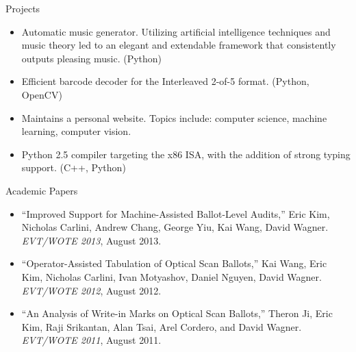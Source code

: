 \documentclass{resume}
\begin{document}
\begin{component}{Projects}
	\begin{itemize}
		\vspace{-0.5em}\item Automatic music generator. Utilizing artificial intelligence techniques and music theory led to an elegant and extendable framework that consistently outputs pleasing music.
		(Python)
        \vspace{-0.5em}\item Efficient barcode decoder
	        for the Interleaved 2-of-5 format. (Python, OpenCV)
        \vspace{-0.5em}\item Maintains a personal website. Topics include: 
        computer science, machine learning, computer vision.
		\vspace{-0.5em}\item Python 2.5 compiler targeting the x86 ISA, with the addition of
		strong typing support. (C++, Python)
	\end{itemize}
\end{component}

\vspace{-0.5em}

\begin{component}{Academic Papers}
\vspace{-0.5em}
	\begin{itemize}
        \item[] ``Improved Support for Machine-Assisted Ballot-Level Audits,'' Eric Kim, Nicholas Carlini, Andrew Chang, George Yiu, Kai Wang, David Wagner. \emph{EVT/WOTE 2013}, August 2013.
\vspace{-0.5em}
        \item[] ``Operator-Assisted Tabulation of Optical Scan Ballots,'' Kai Wang, Eric Kim, Nicholas Carlini, Ivan Motyashov, Daniel Nguyen, David Wagner. \emph{EVT/WOTE 2012}, August 2012.
\vspace{-0.5em}
		\item[] ``An Analysis of Write-in Marks on Optical Scan Ballots,'' Theron Ji, Eric Kim, Raji Srikantan, Alan Tsai, Arel Cordero, and David Wagner. \emph{EVT/WOTE 2011}, August 2011.
\vspace{-0.5em}
	\end{itemize}
\end{component}
\end{document}
